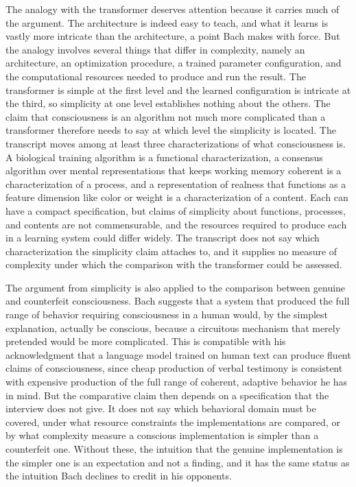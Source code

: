 \documentclass[11pt]{article}
\begin{document}
The analogy with the transformer deserves attention because it carries much of the argument. The architecture is indeed easy to teach, and what it learns is vastly more intricate than the architecture, a point Bach makes with force. But the analogy involves several things that differ in complexity, namely an architecture, an optimization procedure, a trained parameter configuration, and the computational resources needed to produce and run the result. The transformer is simple at the first level and the learned configuration is intricate at the third, so simplicity at one level establishes nothing about the others. The claim that consciousness is an algorithm not much more complicated than a transformer therefore needs to say at which level the simplicity is located. The transcript moves among at least three characterizations of what consciousness is. A biological training algorithm is a functional characterization, a consensus algorithm over mental representations that keeps working memory coherent is a characterization of a process, and a representation of realness that functions as a feature dimension like color or weight is a characterization of a content. Each can have a compact specification, but claims of simplicity about functions, processes, and contents are not commensurable, and the resources required to produce each in a learning system could differ widely. The transcript does not say which characterization the simplicity claim attaches to, and it supplies no measure of complexity under which the comparison with the transformer could be assessed.

The argument from simplicity is also applied to the comparison between genuine and counterfeit consciousness. Bach suggests that a system that produced the full range of behavior requiring consciousness in a human would, by the simplest explanation, actually be conscious, because a circuitous mechanism that merely pretended would be more complicated. This is compatible with his acknowledgment that a language model trained on human text can produce fluent claims of consciousness, since cheap production of verbal testimony is consistent with expensive production of the full range of coherent, adaptive behavior he has in mind. But the comparative claim then depends on a specification that the interview does not give. It does not say which behavioral domain must be covered, under what resource constraints the implementations are compared, or by what complexity measure a conscious implementation is simpler than a counterfeit one. Without these, the intuition that the genuine implementation is the simpler one is an expectation and not a finding, and it has the same status as the intuition Bach declines to credit in his opponents.
\end{document}
